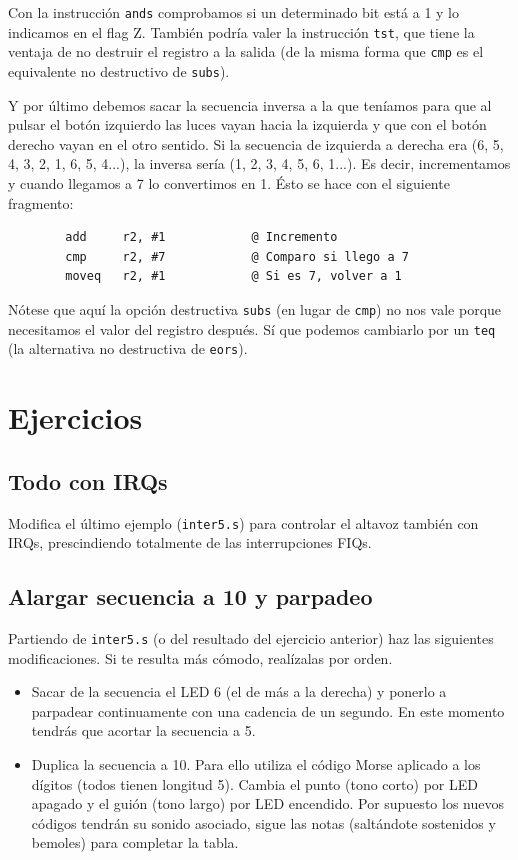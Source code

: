 Con la instrucción {\tt ands} comprobamos si un determinado bit está a 1 y lo indicamos en el
flag Z. También podría valer la instrucción {\tt tst}, que tiene la ventaja de no destruir
el registro a la salida (de la misma forma que {\tt cmp} es el equivalente no destructivo de
{\tt subs}).

Y por último debemos sacar la secuencia inversa a la que teníamos para que al pulsar el
botón izquierdo las luces vayan hacia la izquierda y que con el botón derecho vayan en el otro
sentido. Si la secuencia de izquierda a derecha era  (6, 5, 4, 3, 2, 1, 6, 5, 4...), la
inversa sería (1, 2, 3, 4, 5, 6, 1...). Es decir, incrementamos y cuando llegamos a 7
lo convertimos en 1. Ésto se hace con el siguiente fragmento:

\begin{lstlisting}
        add     r2, #1            @ Incremento
        cmp     r2, #7            @ Comparo si llego a 7
        moveq   r2, #1            @ Si es 7, volver a 1
\end{lstlisting}

Nótese que aquí la opción destructiva {\tt subs} (en lugar de {\tt cmp}) no nos vale porque
necesitamos el valor del registro después. Sí que podemos cambiarlo por un {\tt teq} (la
alternativa no destructiva de {\tt eors}).

\section{Ejercicios}

\subsection{Todo con IRQs}

Modifica el último ejemplo ({\tt inter5.s}) para controlar el altavoz también con IRQs,
prescindiendo totalmente de las interrupciones FIQs.

\subsection{Alargar secuencia a 10 y parpadeo}

Partiendo de {\tt inter5.s} (o del resultado del ejercicio anterior) haz las siguientes
modificaciones. Si te resulta más cómodo, realízalas por orden.

\begin{itemize}
  \item Sacar de la secuencia el LED 6 (el de más a la derecha) y ponerlo a parpadear
        continuamente con una cadencia de un segundo. En este momento tendrás que acortar
        la secuencia a 5.
  \item Duplica la secuencia a 10. Para ello utiliza el código Morse aplicado a los dígitos
        (todos tienen longitud 5). Cambia el punto (tono corto) por LED apagado y el guión
        (tono largo) por LED encendido. Por supuesto los nuevos códigos tendrán su sonido
        asociado, sigue las notas (saltándote sostenidos y bemoles) para completar la tabla.
\end{itemize}

